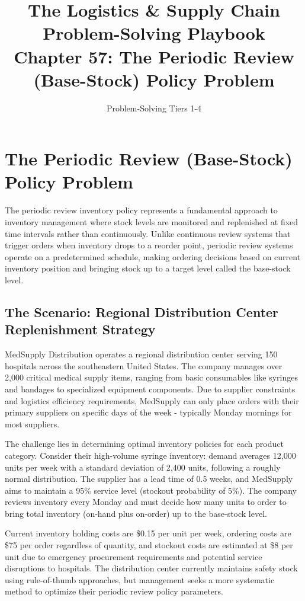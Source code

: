 \documentclass{article}
\title{The Logistics \& Supply Chain Problem-Solving Playbook\\Chapter 57: The Periodic Review (Base-Stock) Policy Problem}
\author{Problem-Solving Tiers 1-4}
\date{}
\begin{document}
\maketitle

\section{The Periodic Review (Base-Stock) Policy Problem}

The periodic review inventory policy represents a fundamental approach to inventory management where stock levels are monitored and replenished at fixed time intervals rather than continuously. Unlike continuous review systems that trigger orders when inventory drops to a reorder point, periodic review systems operate on a predetermined schedule, making ordering decisions based on current inventory position and bringing stock up to a target level called the base-stock level.

\subsection{The Scenario: Regional Distribution Center Replenishment Strategy}

MedSupply Distribution operates a regional distribution center serving 150 hospitals across the southeastern United States. The company manages over 2,000 critical medical supply items, ranging from basic consumables like syringes and bandages to specialized equipment components. Due to supplier constraints and logistics efficiency requirements, MedSupply can only place orders with their primary suppliers on specific days of the week - typically Monday mornings for most suppliers.

The challenge lies in determining optimal inventory policies for each product category. Consider their high-volume syringe inventory: demand averages 12,000 units per week with a standard deviation of 2,400 units, following a roughly normal distribution. The supplier has a lead time of 0.5 weeks, and MedSupply aims to maintain a 95\% service level (stockout probability of 5\%). The company reviews inventory every Monday and must decide how many units to order to bring total inventory (on-hand plus on-order) up to the base-stock level.

Current inventory holding costs are \$0.15 per unit per week, ordering costs are \$75 per order regardless of quantity, and stockout costs are estimated at \$8 per unit due to emergency procurement requirements and potential service disruptions to hospitals. The distribution center currently maintains safety stock using rule-of-thumb approaches, but management seeks a more systematic method to optimize their periodic review policy parameters.
\end{document}
